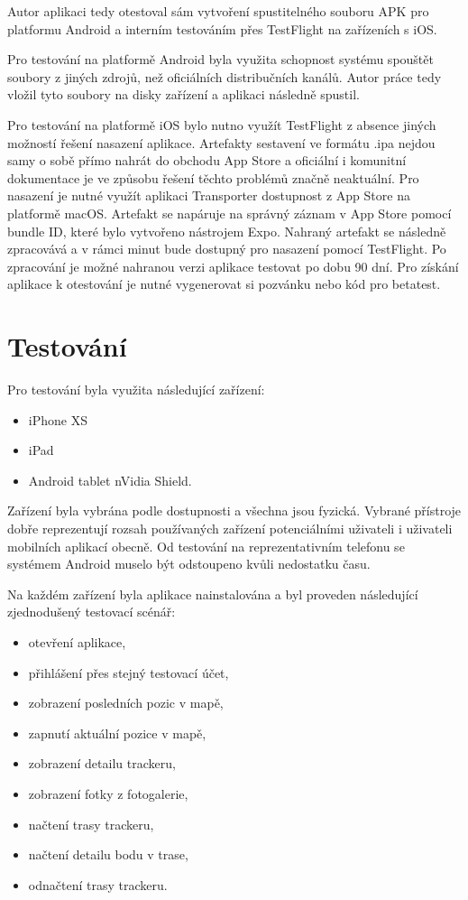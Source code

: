 Autor aplikaci tedy otestoval sám vytvoření spustitelného souboru APK pro platformu Android a interním testováním přes TestFlight na zařízeních s iOS.

Pro testování na platformě Android byla využita schopnost systému spouštět soubory z jiných zdrojů, než oficiálních distribučních kanálů. Autor práce tedy vložil tyto soubory na disky zařízení a aplikaci následně spustil.

Pro testování na platformě iOS bylo nutno využít TestFlight z absence jiných možností řešení nasazení aplikace. Artefakty sestavení ve formátu .ipa nejdou samy o sobě přímo nahrát do obchodu App Store a oficiální i komunitní dokumentace je ve způsobu řešení těchto problémů značně neaktuální. Pro nasazení je nutné využít aplikaci Transporter dostupnost z App Store na platformě macOS. Artefakt se napáruje na správný záznam v App Store pomocí bundle ID, které bylo vytvořeno nástrojem Expo. Nahraný artefakt se následně zpracovává a v rámci minut bude dostupný pro nasazení pomocí TestFlight. Po zpracování je možné nahranou verzi aplikace testovat po dobu 90 dní. Pro získání aplikace k otestování je nutné vygenerovat si pozvánku nebo kód pro betatest.

\section{Testování}
Pro testování byla využita následující zařízení:
\begin{itemize}
	\item iPhone XS
	\item iPad
	\item Android tablet nVidia Shield.
\end{itemize}

Zařízení byla vybrána podle dostupnosti a všechna jsou fyzická. Vybrané přístroje dobře reprezentují rozsah používaných zařízení potenciálními uživateli i uživateli mobilních aplikací obecně. Od testování na reprezentativním telefonu se systémem Android muselo být odstoupeno kvůli nedostatku času.

Na každém zařízení byla aplikace nainstalována a byl proveden následující zjednodušený testovací scénář:

\begin{itemize}
	\item otevření aplikace,
	\item přihlášení přes stejný testovací účet,
	\item zobrazení posledních pozic v mapě,
	\item zapnutí aktuální pozice v mapě,
	\item zobrazení detailu trackeru,
	\item zobrazení fotky z fotogalerie,
	\item načtení trasy trackeru,
	\item načtení detailu bodu v trase,
	\item odnačtení trasy trackeru.
\end{itemize}

